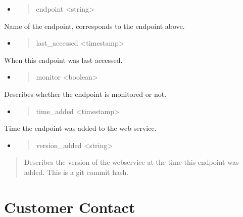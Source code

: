 \begin{itemize}
\item
  \begin{quote}
  endpoint \textless{}string\textgreater{}
  \end{quote}
\end{itemize}

Name of the endpoint, corresponds to the endpoint above.

\begin{itemize}
\item
  \begin{quote}
  last\_accessed \textless{}timestamp\textgreater{}
  \end{quote}
\end{itemize}

When this endpoint was last accessed.

\begin{itemize}
\item
  \begin{quote}
  monitor \textless{}boolean\textgreater{}
  \end{quote}
\end{itemize}

Describes whether the endpoint is monitored or not.

\begin{itemize}
\item
  \begin{quote}
  time\_added \textless{}timestamp\textgreater{}
  \end{quote}
\end{itemize}

Time the endpoint was added to the web service.

\begin{itemize}
\item
  \begin{quote}
  version\_added \textless{}string\textgreater{}
  \end{quote}
\end{itemize}

\begin{quote}
Describes the version of the webservice at the time this endpoint was
added. This is a git commit hash.
\end{quote}

\hypertarget{customer-contact}{%
\section{Customer Contact}\label{customer-contact}}

